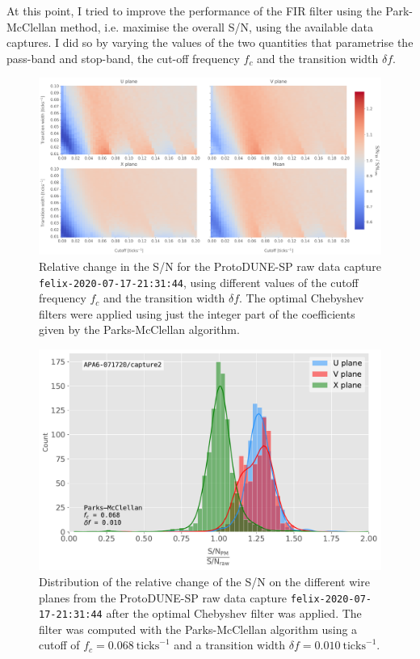 At this point, I tried to improve the performance of the FIR filter using the Park-McClellan method, i.e. maximise the overall S/N, using the available data captures. I did so by varying the values of the two quantities that parametrise the pass-band and stop-band, the cut-off frequency $f_{c}$ and the transition width $\delta f$.

\begin{figure}[t]
	\centering
	\includegraphics[width=1\linewidth]{Images/Matched_Filter/pm_fir_opt.png}
	\caption[Relative change in the S/N of the ProtoDUNE-SP raw data capture for different values of the cutoff frequency $f_{c}$ and the transition width $\delta f$.]{Relative change in the S/N for the ProtoDUNE-SP raw data capture \texttt{felix-2020-07-17-21:31:44}, using different values of the cutoff frequency $f_{c}$ and the transition width $\delta f$. The optimal Chebyshev filters were applied using just the integer part of the coefficients given by the Parks-McClellan algorithm.}
	\label{fig:fir_opt}
\end{figure}

\begin{figure}[t]
	\centering
	\includegraphics[width=0.85\linewidth]{Images/Matched_Filter/pm_fir_perf}
	\caption[Distribution of the relative change of the S/N on the different wire planes after the optimal FIR filter was applied.]{Distribution of the relative change of the S/N on the different wire planes from the ProtoDUNE-SP raw data capture \texttt{felix-2020-07-17-21:31:44} after the optimal Chebyshev filter was applied. The filter was computed with the Parks-McClellan algorithm using a cutoff of $f_{c} = 0.068 \ \mathrm{ticks}^{-1}$ and a transition width $\delta f = 0.010 \ \mathrm{ticks}^{-1}$.}
	\label{fig:fir_best}
\end{figure}


